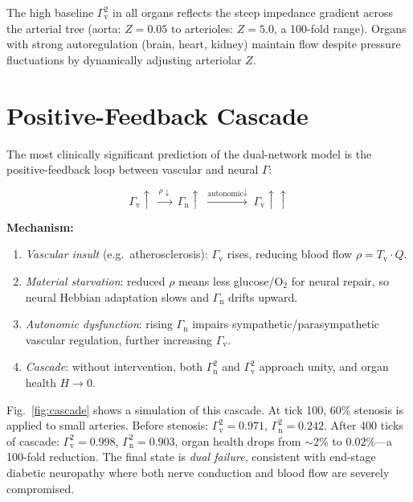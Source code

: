 ﻿\documentclass[aps,pre,twocolumn,superscriptaddress,floatfix]{revtex4-2}
\newcommand{\Gv}{\Gamma_{\mathrm{v}}}
\newcommand{\Gn}{\Gamma_{\mathrm{n}}}
\newcommand{\Tv}{T_{\mathrm{v}}}
\begin{document}
The high baseline $\Gv^2$ in all organs reflects the steep
impedance gradient across the arterial tree (aorta: $Z=0.05$
to arterioles: $Z=5.0$, a 100-fold range).
Organs with strong autoregulation (brain, heart, kidney)
maintain flow despite pressure fluctuations by dynamically
adjusting arteriolar $Z$.


\section{Positive-Feedback Cascade}\label{sec:cascade}

The most clinically significant prediction of the dual-network
model is the positive-feedback loop between vascular and neural
$\Gamma$:

\begin{equation}\label{eq:cascade}
  \Gv\!\uparrow \;\xrightarrow{\rho\downarrow}\;
  \Gn\!\uparrow \;\xrightarrow{\text{autonomic}\downarrow}\;
  \Gv\!\uparrow\!\uparrow
\end{equation}

\textbf{Mechanism:}
\begin{enumerate}
  \item \emph{Vascular insult} (e.g.\ atherosclerosis):
    $\Gv$ rises, reducing blood flow $\rho = \Tv \cdot Q$.
  \item \emph{Material starvation}: reduced $\rho$ means less
    glucose/O$_2$ for neural repair, so neural Hebbian
    adaptation slows and $\Gn$ drifts upward.
  \item \emph{Autonomic dysfunction}: rising $\Gn$ impairs
    sympathetic/parasympathetic vascular regulation,
    further increasing $\Gv$.
  \item \emph{Cascade}: without intervention, both $\Gn^2$
    and $\Gv^2$ approach unity, and organ health
    $H \to 0$.
\end{enumerate}

Fig.~\ref{fig:cascade} shows a simulation of this cascade.
At tick 100, 60\% stenosis is applied to small arteries.
Before stenosis: $\Gv^2 = 0.971$, $\Gn^2 = 0.242$.
After 400 ticks of cascade: $\Gv^2 = 0.998$, $\Gn^2 = 0.903$,
organ health drops from $\sim 2\%$ to $0.02\%$---a 100-fold
reduction.
The final state is \emph{dual failure}, consistent with
end-stage diabetic neuropathy where both nerve conduction
and blood flow are severely compromised.
\end{document}
